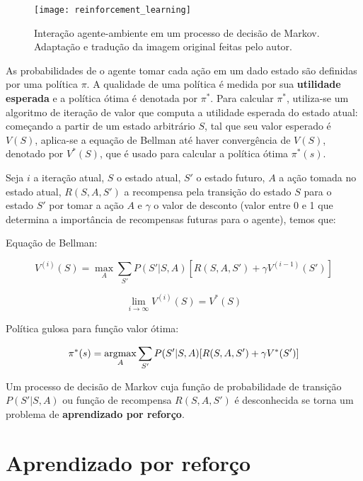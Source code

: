\begin{figure}[h!]
\texttt{[image: reinforcement\_learning]}
\centering
\caption{Interação agente-ambiente em um processo de decisão de Markov\cite{sutton2018reinforcement}. Adaptação e tradução da imagem original feitas pelo autor.}
\end{figure}

As probabilidades de o agente tomar cada ação em um dado estado são definidas por uma política $\pi$.
A qualidade de uma política é medida por sua \textbf{utilidade esperada} e a política ótima é denotada por $\pi^{*}$.
Para calcular $\pi^{*}$, utiliza-se um algoritmo de iteração de valor que computa a utilidade esperada do estado atual:
começando a partir de um estado arbitrário $S$, tal que seu valor esperado é $V(S)$, aplica-se a equação de Bellman até haver convergência de $V(S)$, denotado por $V^{*}(S)$, que é usado para calcular a política ótima $\pi^{*}(s)$.

Seja $i$ a iteração atual, $S$ o estado atual, $S'$ o estado futuro, $A$ a ação tomada no estado atual, $R(S,A,S')$ a recompensa pela transição do estado $S$ para o estado $S'$ por tomar a ação $A$ e $\gamma$ o valor de desconto (valor entre 0 e 1 que determina a importância de recompensas futuras para o agente), temos que:

Equação de Bellman:

\begin{equation} \label{eq:bellman}
V^{(i)}(S) = \max_{A}\sum_{S'}P(S'|S,A)[R(S,A,S') + \gamma V^{(i-1)}(S')]
\end{equation}

\begin{equation} \label{eq:qvalue}
\lim_{i\to\infty} V^{(i)}(S) = V^{*}(S)
\end{equation}

Política gulosa para função valor ótima:

\begin{equation} \label{eq:opt_pol}
\pi^{*}(s) = \operatorname*{argmax}_{A}\sum_{S'}P(S'|S,A)[R(S,A,S') + \gamma V^{*}(S')]
\end{equation}

Um processo de decisão de Markov cuja função de probabilidade de transição $P(S'|S,A)$ ou função de recompensa $R(S,A,S')$ é desconhecida se torna um problema de \textbf{aprendizado por reforço}.


\section{Aprendizado por reforço}
\label{sec:rl}

